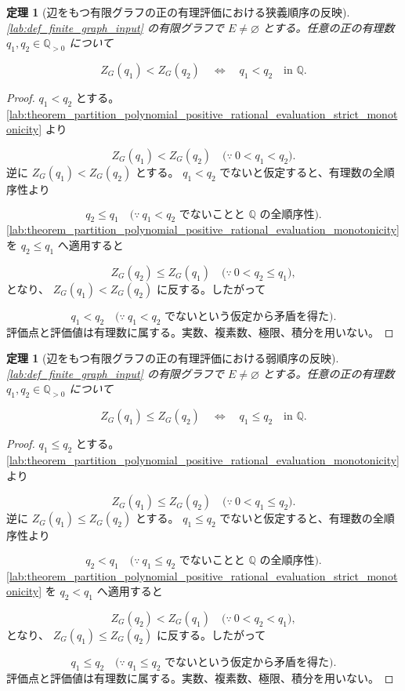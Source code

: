 \documentclass[11pt,a4paper]{article}
\newtheorem{theorem}[definition]{定理}
\theoremstyle{remark}
\begin{document}
\begin{theorem}[辺をもつ有限グラフの正の有理評価における狭義順序の反映]\label{lab:theorem_partition_polynomial_positive_rational_evaluation_order_reflection}
\cref{lab:def_finite_graph_input}
 の有限グラフで 
$E\ne\varnothing$
 とする。任意の正の有理数 
$q_1,q_2\in\mathbb Q_{>0}$
 について

\[Z_G(q_1)<Z_G(q_2)\quad\Longleftrightarrow\quad q_1<q_2\quad\text{in }\mathbb Q.\]
\end{theorem}
\begin{proof}
$q_1<q_2$
 とする。
\cref{lab:theorem_partition_polynomial_positive_rational_evaluation_strict_monotonicity}
 より

\[Z_G(q_1)<Z_G(q_2)
\quad\bigl(\because\ 0<q_1<q_2\bigr).\]
逆に 
$Z_G(q_1)<Z_G(q_2)$
 とする。
$q_1<q_2$
 でないと仮定すると、有理数の全順序性より

\[q_2\le q_1
\quad\bigl(\because\ q_1<q_2\text{ でないことと }\mathbb Q\text{ の全順序性}\bigr).\]
\cref{lab:theorem_partition_polynomial_positive_rational_evaluation_monotonicity}
 を 
$q_2\le q_1$
 へ適用すると

\[Z_G(q_2)\le Z_G(q_1)
\quad\bigl(\because\ 0<q_2\le q_1\bigr),\]
となり、
$Z_G(q_1)<Z_G(q_2)$
 に反する。したがって

\[q_1<q_2
\quad\bigl(\because\ q_1<q_2\text{ でないという仮定から矛盾を得た}\bigr).\]
評価点と評価値は有理数に属する。実数、複素数、極限、積分を用いない。

\end{proof}

\begin{theorem}[辺をもつ有限グラフの正の有理評価における弱順序の反映]\label{lab:theorem_partition_polynomial_positive_rational_evaluation_weak_order_reflection}
\cref{lab:def_finite_graph_input}
 の有限グラフで 
$E\ne\varnothing$
 とする。任意の正の有理数 
$q_1,q_2\in\mathbb Q_{>0}$
 について

\[Z_G(q_1)\le Z_G(q_2)\quad\Longleftrightarrow\quad q_1\le q_2\quad\text{in }\mathbb Q.\]
\end{theorem}
\begin{proof}
$q_1\le q_2$
 とする。
\cref{lab:theorem_partition_polynomial_positive_rational_evaluation_monotonicity}
 より

\[Z_G(q_1)\le Z_G(q_2)
\quad\bigl(\because\ 0<q_1\le q_2\bigr).\]
逆に 
$Z_G(q_1)\le Z_G(q_2)$
 とする。
$q_1\le q_2$
 でないと仮定すると、有理数の全順序性より

\[q_2<q_1
\quad\bigl(\because\ q_1\le q_2\text{ でないことと }\mathbb Q\text{ の全順序性}\bigr).\]
\cref{lab:theorem_partition_polynomial_positive_rational_evaluation_strict_monotonicity}
 を 
$q_2<q_1$
 へ適用すると

\[Z_G(q_2)<Z_G(q_1)
\quad\bigl(\because\ 0<q_2<q_1\bigr),\]
となり、
$Z_G(q_1)\le Z_G(q_2)$
 に反する。したがって

\[q_1\le q_2
\quad\bigl(\because\ q_1\le q_2\text{ でないという仮定から矛盾を得た}\bigr).\]
評価点と評価値は有理数に属する。実数、複素数、極限、積分を用いない。

\end{proof}
\end{document}
